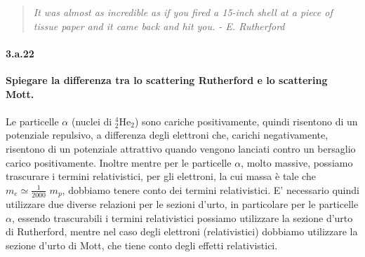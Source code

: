 \documentclass[twoside]{article}
\begin{document}
\begin{quote}
\textit{It was almost as incredible as if you fired a 15-inch shell at a piece of tissue paper and it came back and hit you. - E. Rutherford}
\end{quote}

\paragraph{3.a.22}\textbf{Spiegare la differenza tra lo scattering Rutherford e lo scattering Mott.}\\
\\
Le particelle $\alpha$ (nuclei di ${}_2^4$He$_2$) sono cariche positivamente, quindi risentono di un potenziale repulsivo, a differenza degli elettroni che, carichi negativamente, risentono di un potenziale attrattivo quando vengono lanciati contro un bersaglio carico positivamente. Inoltre mentre per le particelle $\alpha$, molto massive, possiamo trascurare i termini relativistici, per gli elettroni, la cui massa è tale che $m_e \simeq \frac{1}{2000}$ $m_p$, dobbiamo tenere conto dei termini relativistici. E' necessario quindi utilizzare due diverse relazioni per le sezioni d'urto, in particolare per le particelle $\alpha$, essendo trascurabili i termini relativistici possiamo utilizzare la sezione d'urto di Rutherford, mentre nel caso degli elettroni (relativistici) dobbiamo utilizzare la sezione d'urto di Mott, che tiene conto degli effetti relativistici. 
\end{document}
